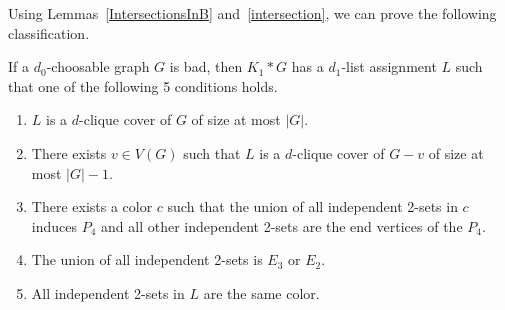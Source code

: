 Using Lemmas~\ref{IntersectionsInB} and~\ref{intersection}, we can prove the
following classification.

\begin{lem}
\label{BadCharacterization}
If a $d_0$-choosable graph $G$ is bad, then $K_1*G$ has a $d_1$-list assignment
$L$ such that one of the following 5 conditions holds.
\begin{enumerate}
\item $L$ is a $d$-clique cover of $G$ of size at most $|G|$.
\item There exists $v\in V(G)$ such that $L$ is a $d$-clique cover of $G-v$ of
size at most $|G|-1$.
\item There exists a color $c$ such that the union of all independent 2-sets in $c$
induces $P_4$ and all other independent 2-sets are the end vertices of the $P_4$.
\item The union of all independent 2-sets is $E_3$ or $E_2$.
\item All independent 2-sets in $L$ are the same color.
\end{enumerate}
\end{lem}
